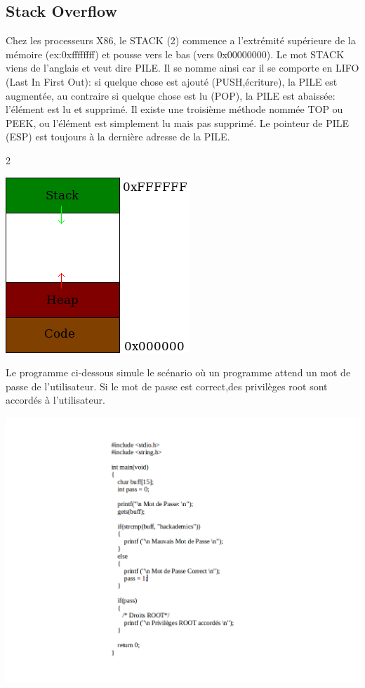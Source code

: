 \subsection{Stack Overflow}\label{vulnerabilites:applicatives:buffer-overflow:stack}

Chez les processeurs X86, le STACK (2) commence a l’extrémité supérieure de la mémoire (ex:0xffffffff) et pousse vers le bas (vers 0x00000000). Le mot STACK viens de l'anglais et veut dire PILE. Il se nomme ainsi car il se comporte en LIFO (Last In First Out): si quelque chose est ajouté (PUSH,écriture), la PILE est augmentée, au contraire si quelque chose est lu (POP), la PILE est abaissée: l'élément est lu et supprimé. Il existe une troisième méthode nommée TOP ou PEEK, ou l'élément est simplement lu mais pas supprimé. Le pointeur de PILE (ESP) est toujours à la dernière adresse de la PILE.


\begin{center}
\caption{2}
\includegraphics[scale=0.5]{Application/assets/stack.png}
\end{center}

\begin{flushleft}
Le programme ci-dessous simule le scénario où un programme attend un mot de passe de l'utilisateur. Si le mot de passe est correct,des privilèges root sont accordés à l'utilisateur.
\end{flushleft}

\begin{center}
\includegraphics[scale=0.5]{Application/assets/codebo.png}
\end{center}

